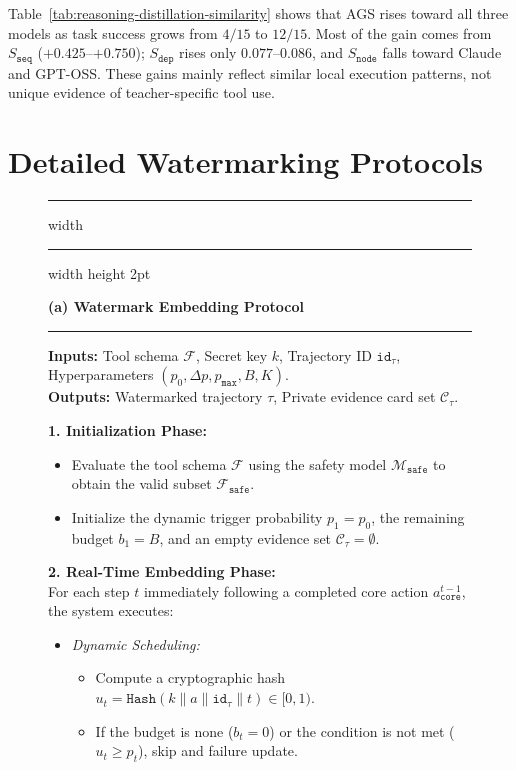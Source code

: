 Table~\ref{tab:reasoning-distillation-similarity} shows that AGS rises
toward all three models as task success grows from $4/15$ to $12/15$.
Most of the gain comes from $S_{\mathtt{seq}}$ ($+0.425$--$+0.750$);
$S_{\mathtt{dep}}$ rises only $0.077$--$0.086$, and $S_{\mathtt{node}}$
falls toward Claude and GPT-OSS. These gains mainly reflect similar local
execution patterns, not unique evidence of teacher-specific tool use.


\section{Detailed Watermarking Protocols}

\begin{figure}[!t]
\hrule width \hsize \kern 1mm \hrule width \hsize height 2pt 

\textbf{(a) \name{} Watermark Embedding Protocol}

\hrule

\textbf{Inputs:} Tool schema $\mathcal{F}$, Secret key $k$, Trajectory ID $\mathtt{id}_\tau$, Hyperparameters $(p_0, \Delta p, p_{\mathtt{max}}, B, K)$. \\
\textbf{Outputs:} Watermarked trajectory $\tau$, Private evidence card set $\mathcal{C}_\tau$.


\noindent \textbf{1. Initialization Phase:} 
\begin{itemize}
    \item[\textendash] Evaluate the tool schema $\mathcal{F}$ using the safety model $\mathcal{M}_{\mathtt{safe}}$ to obtain the valid subset $\mathcal{F}_{\mathtt{safe}}$.
    \item[\textendash] Initialize the dynamic trigger probability $p_1=p_0$, the remaining budget $b_1=B$, and an empty evidence set $\mathcal{C}_\tau=\emptyset$.
\end{itemize}

\noindent \textbf{2. Real-Time Embedding Phase:} \\
For each step $t$ immediately following a completed core action $a_{\mathtt{core}}^{t-1}$, the system executes:
\begin{itemize}
    \item \textit{Dynamic Scheduling:}
\begin{itemize}
        \item Compute a cryptographic hash $u_t = \mathtt{Hash}(k \parallel a \parallel \mathtt{id}_\tau \parallel t) \in [0, 1)$.
        \item If the budget is none ($b_t = 0$) or the condition is not met ($u_t \ge p_t$), skip and failure update.
    \end{itemize}
    

\end{itemize}
\end{figure}
